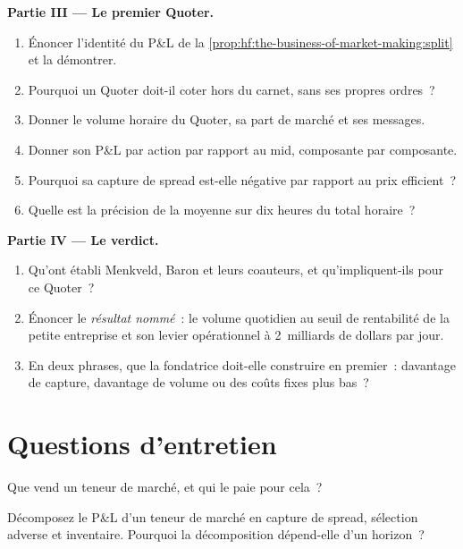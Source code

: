 \begin{problem}
\medskip\noindent\textbf{Partie III --- Le premier Quoter.}
\begin{enumerate}[resume]
\item Énoncer l'identité du P\&L de la \cref{prop:hf:the-business-of-market-making:split} et la démontrer.
\item Pourquoi un Quoter doit-il coter hors du carnet, sans ses propres ordres~?
\item Donner le volume horaire du Quoter, sa part de marché et ses messages.
\item Donner son P\&L par action par rapport au mid, composante par composante.
\item Pourquoi sa capture de spread est-elle négative par rapport au prix efficient~?
\item Quelle est la précision de la moyenne sur dix heures du total horaire~?
\end{enumerate}

\medskip\noindent\textbf{Partie IV --- Le verdict.}
\begin{enumerate}[resume]
\item Qu'ont établi Menkveld, Baron et leurs coauteurs, et qu'impliquent-ils pour ce Quoter~?
\item Énoncer le \emph{résultat nommé}~: le volume quotidien au seuil de rentabilité de la petite entreprise et son levier opérationnel à 2~milliards de dollars par jour.
\item En deux phrases, que la fondatrice doit-elle construire en premier~: davantage de capture, davantage de volume ou des coûts fixes plus bas~?
\end{enumerate}
\end{problem}

\section{Questions d'entretien}

\begin{interviewq}\label{iq:hf:the-business-of-market-making:1}
Que vend un teneur de marché, et qui le paie pour cela~?
\end{interviewq}

\begin{interviewq}\label{iq:hf:the-business-of-market-making:2}
Décomposez le P\&L d'un teneur de marché en capture de spread, sélection adverse et inventaire. Pourquoi la décomposition dépend-elle d'un horizon~?
\end{interviewq}

